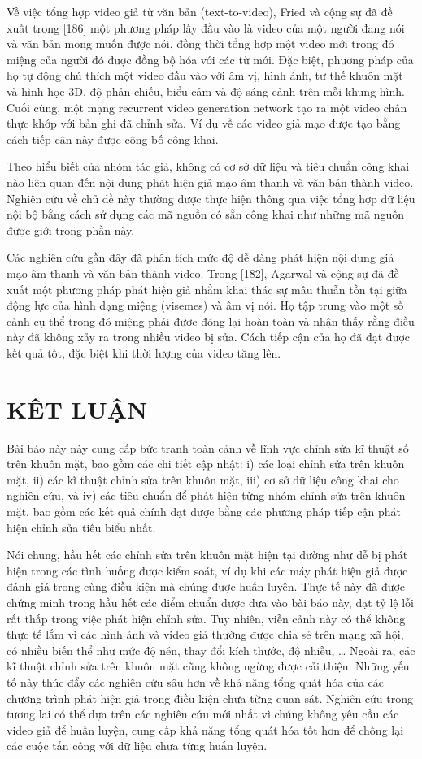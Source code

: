 \documentclass{article}
\begin{document}
Về việc tổng hợp video giả từ văn bản (text-to-video), Fried và cộng sự đã đề xuất trong [186] một phương pháp lấy đầu vào là video của một người đang nói và văn bản mong muốn được nói, đồng thời tổng hợp một video mới trong đó miệng của người đó được đồng bộ hóa với các từ mới. Đặc biệt, phương pháp của họ tự động chú thích một video đầu vào với âm vị, hình ảnh, tư thế khuôn mặt và hình học 3D, độ phản chiếu, biểu cảm và độ sáng cảnh trên mỗi khung hình. Cuối cùng, một mạng recurrent video generation network tạo ra một video chân thực khớp với bản ghi đã chỉnh sửa. Ví dụ về các video giả mạo được tạo bằng cách tiếp cận này được công bố công khai.

Theo hiểu biết của nhóm tác giả, không có cơ sở dữ liệu và tiêu chuẩn công khai nào liên quan đến nội dung phát hiện giả mạo âm thanh và văn bản thành video. Nghiên cứu về chủ đề này thường được thực hiện thông qua việc tổng hợp dữ liệu nội bộ bằng cách sử dụng các mã nguồn có sẵn công khai như những mã nguồn được giới trong phần này.

Các nghiên cứu gần đây đã phân tích mức độ dễ dàng phát hiện nội dung giả mạo âm thanh và văn bản thành video. Trong [182], Agarwal và cộng sự đã đề xuất một phương pháp phát hiện giả nhằm khai thác sự mâu thuẫn tồn tại giữa động lực của hình dạng miệng (visemes) và âm vị nói. Họ tập trung vào một số cảnh cụ thể trong đó miệng phải được đóng lại hoàn toàn và nhận thấy rằng điều này đã không xảy ra trong nhiều video bị sửa. Cách tiếp cận của họ đã đạt được kết quả tốt, đặc biệt khi thời lượng của video tăng lên.

\section{KÊT LUẬN}

Bài báo này này cung cấp bức tranh toàn cảnh về lĩnh vực chỉnh sửa kĩ thuật số trên khuôn mặt, bao gồm các chi tiết cập nhật: i) các loại chỉnh sửa trên khuôn mặt, ii) các kĩ thuật chỉnh sửa trên khuôn mặt, iii) cơ sở dữ liệu công khai cho nghiên cứu, và iv) các tiêu chuẩn để phát hiện từng nhóm chỉnh sửa trên khuôn mặt, bao gồm các kết quả chính đạt được bằng các phương pháp tiếp cận phát hiện chỉnh sửa tiêu biểu nhất.

Nói chung, hầu hết các chỉnh sửa trên khuôn mặt hiện tại dường như dễ bị phát hiện trong các tình huống được kiểm soát, ví dụ khi các máy phát hiện giả được đánh giá trong cùng điều kiện mà chúng được huấn luyện. Thực tế này đã được chứng minh trong hầu hết các điểm chuẩn được đưa vào bài báo này, đạt tỷ lệ lỗi rất thấp trong việc phát hiện chỉnh sửa. Tuy nhiên, viễn cảnh này có thể không thực tế lắm vì các hình ảnh và video giả thường được chia sẻ trên mạng xã hội, có nhiều biến thể như mức độ nén, thay đổi kích thước, độ nhiễu, … Ngoài ra, các kĩ thuật chỉnh sửa trên khuôn mặt cũng không ngừng được cải thiện. Những yếu tố này thúc đẩy các nghiên cứu sâu hơn về khả năng tổng quát hóa của các chương trình phát hiện giả trong điều kiện chưa từng quan sát. Nghiên cứu trong tương lai có thể dựa trên các nghiên cứu mới nhất vì chúng không yêu cầu các video giả để huấn luyện, cung cấp khả năng tổng quát hóa tốt hơn để chống lại các cuộc tấn công với dữ liệu chưa từng huấn luyện.
\end{document}
